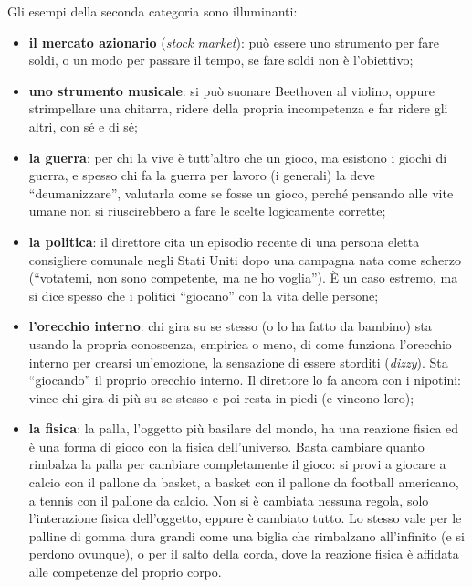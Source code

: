 Gli esempi della seconda categoria sono illuminanti:
\begin{itemize}
  \item \textbf{il mercato azionario} (\emph{stock market}): può essere uno
        strumento per fare soldi, o un modo per passare il tempo, se fare soldi
        non è l'obiettivo;
  \item \textbf{uno strumento musicale}: si può suonare Beethoven al violino,
        oppure strimpellare una chitarra, ridere della propria incompetenza e
        far ridere gli altri, con sé e di sé;
  \item \textbf{la guerra}: per chi la vive è tutt'altro che un gioco, ma
        esistono i giochi di guerra, e spesso chi fa la guerra per lavoro (i
        generali) la deve ``deumanizzare'', valutarla come se fosse un gioco,
        perché pensando alle vite umane non si riuscirebbero a fare le scelte
        logicamente corrette;
  \item \textbf{la politica}: il direttore cita un episodio recente di una
        persona eletta consigliere comunale negli Stati Uniti dopo una campagna
        nata come scherzo (``votatemi, non sono competente, ma ne ho voglia'').
        È un caso estremo, ma si dice spesso che i politici ``giocano'' con la
        vita delle persone;
  \item \textbf{l'orecchio interno}: chi gira su se stesso (o lo ha fatto da
        bambino) sta usando la propria conoscenza, empirica o meno, di come
        funziona l'orecchio interno per crearsi un'emozione, la sensazione di
        essere storditi (\emph{dizzy}). Sta ``giocando'' il proprio orecchio
        interno. Il direttore lo fa ancora con i nipotini: vince chi gira di più
        su se stesso e poi resta in piedi (e vincono loro);
  \item \textbf{la fisica}: la palla, l'oggetto più basilare del mondo, ha una
        reazione fisica ed è una forma di gioco con la fisica dell'universo.
        Basta cambiare quanto rimbalza la palla per cambiare completamente il
        gioco: si provi a giocare a calcio con il pallone da basket, a basket
        con il pallone da football americano, a tennis con il pallone da
        calcio. Non si è cambiata nessuna regola, solo l'interazione fisica
        dell'oggetto, eppure è cambiato tutto. Lo stesso vale per le
        palline di gomma dura grandi come una biglia che rimbalzano
        all'infinito (e si perdono ovunque), o per il salto della corda, dove
        la reazione fisica è affidata alle competenze del proprio corpo.
\end{itemize}

